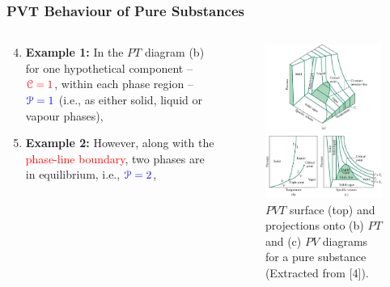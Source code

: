 \documentclass[10pt,compress]{beamer}
\begin{document}
\begin{frame}
 \frametitle{PVT Behaviour of Pure Substances}
 \begin{columns}
   \begin{column}[l]{0.5\linewidth}
     \begin{enumerate}\setcounter{enumi}{3}\scriptsize
        \item <1-> {\bf Example 1:} In the $PT$ diagram (b) for one hypothetical component -- $\textcolor{red}{\mathcal{C}=1}$, within each phase region -- $\textcolor{blue}{\mathcal{P}=1}$ (i.e., as either solid, liquid or vapour phases),
        \item <2-> {\bf Example 2:} However, along with the \textcolor{red}{phase-line boundary}, two phases are in equilibrium, i.e., $\textcolor{blue}{\mathcal{P}=2}$,%
     \end{enumerate}
  \end{column}
  \begin{column}[l]{0.5\linewidth}
   \begin{figure}%
    \begin{center}
     \includegraphics[width=4.cm,clip]{./Pics/PVT_Surface.jpg}
    \end{center}
    \scriptsize\caption{\scriptsize$PVT$ surface (top) and projections onto (b) $PT$ and (c) $PV$ diagrams for a pure substance (Extracted from [4]).}
   \end{figure}    
  \end{column}
 \end{columns}
\end{frame}
 
\end{document}
